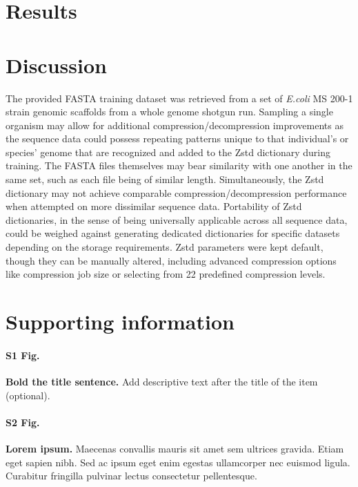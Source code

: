 \documentclass[
  10pt,
  letterpaper,
]{article}
\begin{document}
\hypertarget{results}{%
\section{Results}\label{results}}

\hypertarget{discussion}{%
\section{Discussion}\label{discussion}}

The provided FASTA training dataset was retrieved from a set of
\textit{E.coli} MS 200-1 strain genomic scaffolds from a whole genome
shotgun run\citep{ncbi}. Sampling a single organism may allow for
additional compression/decompression improvements as the sequence data
could possess repeating patterns unique to that individual's or species'
genome that are recognized and added to the Zstd dictionary during
training. The FASTA files themselves may bear similarity with one
another in the same set, such as each file being of similar length.
Simultaneously, the Zstd dictionary may not achieve comparable
compression/decompression performance when attempted on more dissimilar
sequence data. Portability of Zstd dictionaries, in the sense of being
universally applicable across all sequence data, could be weighed
against generating dedicated dictionaries for specific datasets
depending on the storage requirements. Zstd parameters were kept
default, though they can be manually altered, including advanced
compression options like compression job size or selecting from 22
predefined compression levels\citep{facebook}.

\hypertarget{supporting-information}{%
\section{Supporting information}\label{supporting-information}}

\paragraph*{S1 Fig.}
\label{s1-fig}
{\textbf{Bold the title sentence.}} Add descriptive text after the title
of the item (optional).

\paragraph*{S2 Fig.}
\label{s2-fig}
{\textbf{Lorem ipsum.}} Maecenas convallis mauris sit amet sem ultrices
gravida. Etiam eget sapien nibh. Sed ac ipsum eget enim egestas
ullamcorper nec euismod ligula. Curabitur fringilla pulvinar lectus
consectetur pellentesque.
\end{document}
